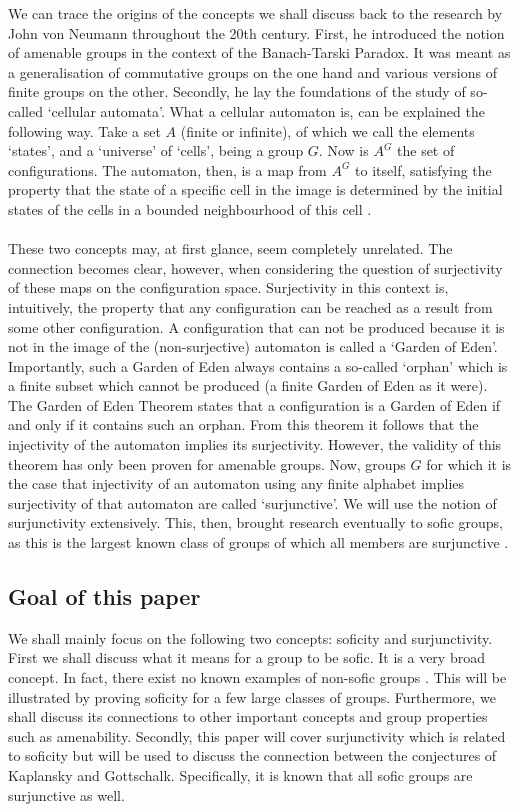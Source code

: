 \documentclass[titlepage, a4paper]{article}
\theoremstyle{remark}
\begin{document}
We can trace the origins of the concepts we shall discuss back to the research by John von Neumann throughout the 20th century. First, he introduced the notion of amenable groups in the context of the Banach-Tarski Paradox. It was meant as a generalisation of commutative groups on the one hand and various versions of finite groups on the other. Secondly, he lay the foundations of the study of so-called ‘cellular automata’. What a cellular automaton is, can be explained the following way. Take a set $A$ (finite or infinite), of which we call the elements ‘states’, and a ‘universe’ of ‘cells’, being a group $G$. Now is $A^G$ the set of configurations. The automaton, then, is a map from $A^G$ to itself, satisfying the property that the state of a specific cell in the image is determined by the initial states of the cells in a bounded neighbourhood of this cell \cite{vonNeumann_1966} .\\
\\
These two concepts may, at first glance, seem completely unrelated. The connection becomes clear, however, when considering the question of surjectivity of these maps on the configuration space. Surjectivity in this context is, intuitively, the property that any configuration can be reached as a result from some other configuration. A configuration that can not be produced because it is not in the image of the (non-surjective) automaton is called a ‘Garden of Eden’. Importantly, such a Garden of Eden always contains a so-called ‘orphan’ which is a finite subset which cannot be produced (a finite Garden of Eden as it were). The Garden of Eden Theorem states that a configuration is a Garden of Eden if and only if it contains such an orphan. From this theorem it follows that the injectivity of the automaton implies its surjectivity. However, the validity of this theorem has only been proven for amenable groups.
Now, groups $G$ for which it is the case that injectivity of an automaton using any finite alphabet implies surjectivity of that automaton are called ‘surjunctive’. We will use the notion of surjunctivity extensively. This, then, brought research eventually to sofic groups, as this is the largest known class of groups of which all members are surjunctive \cite{ceccherini-silberstein_coornaert_2010}.  

\subsection*{Goal of this paper}

We shall mainly focus on the following two concepts: soficity and surjunctivity. First we shall discuss what it means for a group to be sofic. It is a very broad concept. In fact, there exist no known examples of non-sofic groups \cite{weiss_2000}. This will be illustrated by proving soficity for a few large classes of groups. Furthermore, we shall discuss its connections to other important concepts and group properties such as amenability. Secondly, this paper will cover surjunctivity which is related to soficity but will be used to discuss the connection between the conjectures of Kaplansky and Gottschalk. Specifically, it is known that all sofic groups are surjunctive as well.
\end{document}
